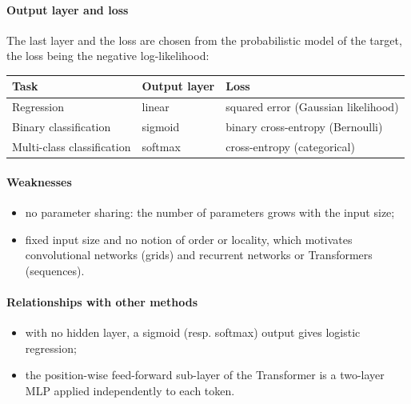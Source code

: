 \paragraph{Output layer and loss}
The last layer and the loss are chosen from the probabilistic model of the target,
the loss being the negative log-likelihood:
\begin{center}
\begin{tabular}{|l|l|l|}
    \hline
    Task & Output layer & Loss\\
    \hline
    Regression & linear & squared error (Gaussian likelihood)\\
    Binary classification & sigmoid & binary cross-entropy (Bernoulli)\\
    Multi-class classification & softmax & cross-entropy (categorical)\\
    \hline
\end{tabular}
\end{center}

\paragraph{Weaknesses}
\begin{itemize}
    \item no parameter sharing: the number of parameters grows with the input size;
    \item fixed input size and no notion of order or locality, which motivates
        convolutional networks (grids) and recurrent networks or Transformers (sequences).
\end{itemize}

\paragraph{Relationships with other methods}
\begin{itemize}
    \item with no hidden layer, a sigmoid (resp. softmax) output gives logistic regression;
    \item the position-wise feed-forward sub-layer of the Transformer is a two-layer MLP
        applied independently to each token.
\end{itemize}
